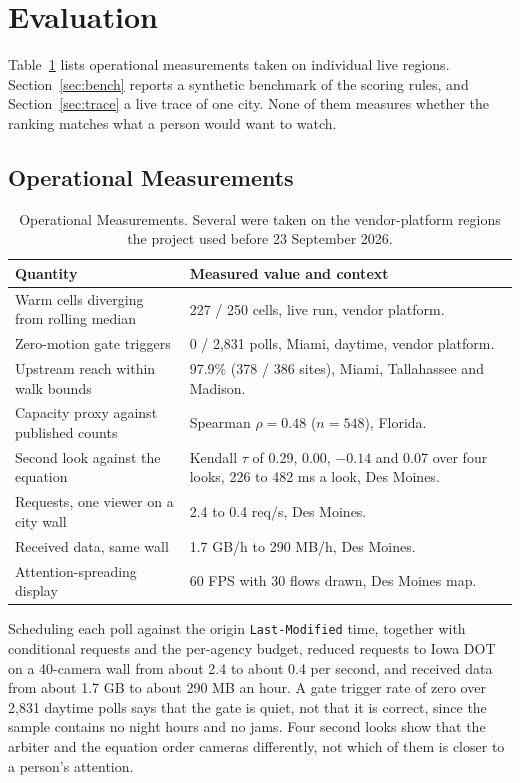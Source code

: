 \documentclass[10pt,journal,compsoc]{IEEEtran}
\begin{document}
\section{Evaluation}
\label{sec:evaluation}
Table~\ref{tab:measurements} lists operational measurements taken on individual live regions. Section~\ref{sec:bench} reports a synthetic benchmark of the scoring rules, and Section~\ref{sec:trace} a live trace of one city. None of them measures whether the ranking matches what a person would want to watch.

\subsection{Operational Measurements}

\begin{table}[!t]
\renewcommand{\arraystretch}{1.2}
\caption{Operational Measurements. Several were taken on the vendor-platform regions the project used before 23 September 2026.}
\label{tab:measurements}
\centering
\begin{tabularx}{\columnwidth}{lX}
\toprule
\textbf{Quantity} & \textbf{Measured value and context} \\
\midrule
Warm cells diverging from rolling median & 227 / 250 cells, live run, vendor platform. \\
Zero-motion gate triggers & 0 / 2,831 polls, Miami, daytime, vendor platform. \\
Upstream reach within walk bounds & 97.9\% (378 / 386 sites), Miami, Tallahassee and Madison. \\
Capacity proxy against published counts & Spearman $\rho = 0.48$ ($n = 548$), Florida. \\
Second look against the equation & Kendall $\tau$ of 0.29, 0.00, $-0.14$ and 0.07 over four looks, 226 to 482 ms a look, Des Moines. \\
Requests, one viewer on a city wall & 2.4 to 0.4 req/s, Des Moines. \\
Received data, same wall & 1.7 GB/h to 290 MB/h, Des Moines. \\
Attention-spreading display & 60 FPS with 30 flows drawn, Des Moines map. \\
\bottomrule
\end{tabularx}
\end{table}

Scheduling each poll against the origin \texttt{Last-Modified} time, together with conditional requests and the per-agency budget, reduced requests to Iowa DOT on a 40-camera wall from about 2.4 to about 0.4 per second, and received data from about 1.7 GB to about 290 MB an hour. A gate trigger rate of zero over 2,831 daytime polls says that the gate is quiet, not that it is correct, since the sample contains no night hours and no jams. Four second looks show that the arbiter and the equation order cameras differently, not which of them is closer to a person's attention.
\end{document}
